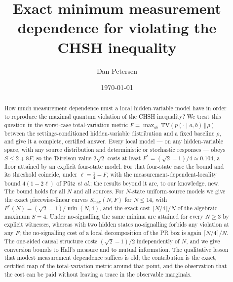 \documentclass[aps,pra,reprint,superscriptaddress,floatfix]{revtex4-2}
\newcommand{\TV}{\mathrm{TV}}
\begin{document}
\title{Exact minimum measurement dependence for violating the CHSH inequality}
\author{Dan Petersen}
\noaffiliation

\date{\today}

\begin{abstract}
How much measurement dependence must a local hidden-variable model have in
order to reproduce the maximal quantum violation of the CHSH inequality? We
treat this question in the worst-case total-variation metric
$F=\max_{ab}\,\TV(p(\cdot\mid a,b)\,\Vert\,\rho)$ between the
settings-conditioned hidden-variable distribution and a fixed baseline
$\rho$, and give it a complete, certified answer. Every local model --- on
any hidden-variable space, with any source distribution and deterministic
or stochastic responses --- obeys $S\le 2+8F$, so the Tsirelson value
$2\sqrt2$ costs at least $F^*=(\sqrt2-1)/4\approx0.104$, a floor attained
by an explicit four-state model. For that four-state case the bound and
its threshold coincide, under $\ell=\tfrac14-F$, with the
measurement-dependent-locality bound $4(1-2\ell)$ of P\"utz \emph{et al.};
the results beyond it are, to our knowledge, new. The bound holds for all
$N$ and all sources. For $N$-state uniform-source models we give the exact
piecewise-linear curves $S_{\max}(N,F)$ for $N\le14$, with
$F^*(N)=(\sqrt2-1)/\min(N,4)$, and the exact cost $\lceil N/4\rceil/N$ of
the algebraic maximum $S=4$. Under no-signalling the same minima are
attained for every $N\ge3$ by explicit witnesses, whereas with two hidden
states no-signalling forbids any violation at any $F$; the no-signalling
cost of a local decomposition of the PR box is again $\lceil N/4\rceil/N$.
The one-sided causal structure costs $(\sqrt2-1)/2$ independently of $N$,
and we give conversion bounds to Hall's measure and to mutual information.
The qualitative lesson that modest measurement dependence suffices is old;
the contribution is the exact, certified map of the total-variation metric
around that point, and the observation that the cost can be paid without
leaving a trace in the observable marginals.
\end{abstract}


\maketitle
\end{document}
